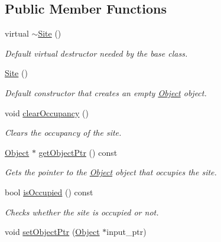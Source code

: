 \subsection*{Public Member Functions}
\begin{DoxyCompactItemize}
\item 
\mbox{\label{class_site_a81f7ae39aaa7a981a6871c4816ee5562}} 
virtual \hyperlink{class_site_a81f7ae39aaa7a981a6871c4816ee5562}{$\sim$\+Site} ()
\begin{DoxyCompactList}\small\item\em Default virtual destructor needed by the base class. \end{DoxyCompactList}\item 
\mbox{\label{class_site_a4119f95c45d57d6edf419169dea993f4}} 
\hyperlink{class_site_a4119f95c45d57d6edf419169dea993f4}{Site} ()
\begin{DoxyCompactList}\small\item\em Default constructor that creates an empty \hyperlink{class_object}{Object} object. \end{DoxyCompactList}\item 
void \hyperlink{class_site_a46ff077954e39046b493ee1ea57a9c93}{clear\+Occupancy} ()
\begin{DoxyCompactList}\small\item\em Clears the occupancy of the site. \end{DoxyCompactList}\item 
\mbox{\label{class_site_aecb14e440914b4d3d4aa7294419791e2}} 
\hyperlink{class_object}{Object} $\ast$ \hyperlink{class_site_aecb14e440914b4d3d4aa7294419791e2}{get\+Object\+Ptr} () const
\begin{DoxyCompactList}\small\item\em Gets the pointer to the \hyperlink{class_object}{Object} object that occupies the site. \end{DoxyCompactList}\item 
bool \hyperlink{class_site_a30991b768ded0bb441c5bb54a789160a}{is\+Occupied} () const
\begin{DoxyCompactList}\small\item\em Checks whether the site is occupied or not. \end{DoxyCompactList}\item 
void \hyperlink{class_site_a9a0d305451d7732dbb193e7fd2f502ca}{set\+Object\+Ptr} (\hyperlink{class_object}{Object} $\ast$input\+\_\+ptr)

\end{DoxyCompactItemize}
